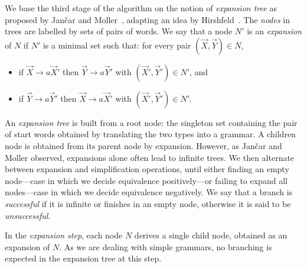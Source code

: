 We base the third stage of the algorithm on the notion of
\emph{expansion tree} as proposed by Jan{\v{c}}ar and
Moller~\cite{janvcar1999techniques}, adapting an idea by
Hirshfeld~\cite{hirshfeld1996bisimulation}. The \emph{nodes} in trees
are labelled by sets of pairs of words.
%
We say that a node $N'$ is an \emph{expansion} of $N$ if $N'$ is a
minimal set such that: for every pair $(\vec X, \vec Y) \in N$,
\begin{itemize}
\item if $\vec X \rightarrow a\vec X'$ then
  $\vec Y \rightarrow a\vec Y'$ with $(\vec X',\vec Y')\in N'$, and
\item if $\vec Y \rightarrow a\vec Y'$ then
  $\vec X \rightarrow a \vec X'$ with $(\vec X',\vec Y')\in N'$.
\end{itemize}

An \emph{expansion tree} is built from a root node: the singleton set
containing the pair of start words obtained by translating the two
types into a grammar. A children node is obtained from its parent
node by expansion. However, as Jan{\v{c}}ar and Moller observed, expansions
alone often lead to infinite trees. We then alternate between
expansion and simplification operations, until either finding an empty
node---case in which we decide equivalence positively---or failing to
expand all nodes---case in which we decide equivalence negatively.
%
%
We say that a branch is \emph{successful} if it is infinite or
finishes in an empty node, otherwise it is said to be
\emph{unsuccessful}.

In the \emph{expansion step}, each node $N$ derives a single child
node, obtained as an expansion of $N$. As we are dealing with simple
grammars, no branching is expected in the expansion tree at this
step.
%

